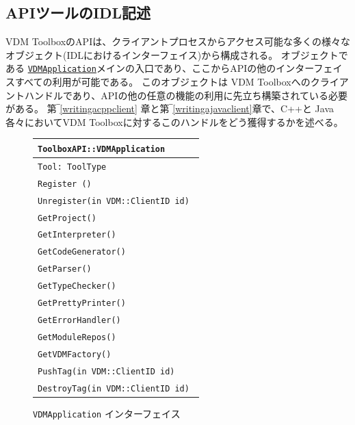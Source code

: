\documentclass[\pformat,12pt]{jarticle}
\newcommand{\VDMApplication}{\hyperlink{interface.VDMApplication}{VDMApplication}}
\begin{document}
\subsection{APIツールのIDL記述}
\label{idldescriptiontool}

VDM ToolboxのAPIは、クライアントプロセスからアクセス可能な多くの様々なオブジェクト(IDLにおけるインターフェイス)から構成される。
オブジェクトである {\tt  \VDMApplication}メインの入口であり、ここからAPIの他のインターフェイスすべての利用が可能である。
このオブジェクトは VDM Toolboxへのクライアントハンドルであり、APIの他の任意の機能の利用に先立ち構築されている必要がある。
第‾\ref{writingacppclient} 章と第‾\ref{writingajavaclient}章で、C++と Java各々においてVDM Toolboxに対するこのハンドルをどう獲得するかを述べる。


\begin{figure}[tbh]
\begin{center}
\begin{tabular}{|l|}
\hline
{\tt ToolboxAPI::VDMApplication } \\
\hline
{\tt Tool: ToolType } \\
\hline
{\tt Register () } \\
{\tt Unregister(in VDM::ClientID id) } \\
{\tt GetProject() }\\
{\tt GetInterpreter() }\\
{\tt GetCodeGenerator() }\\
{\tt GetParser() }\\
{\tt GetTypeChecker() }\\
{\tt  GetPrettyPrinter() }\\
{\tt GetErrorHandler() }\\
{\tt GetModuleRepos() }\\
{\tt GetVDMFactory() }\\
{\tt PushTag(in VDM::ClientID id) }\\
{\tt DestroyTag(in VDM::ClientID id) }\\
\hline
\end{tabular}
\caption{{\tt VDMApplication} インターフェイス}\label{fig:VDMApplication}
\end{center}
\end{figure}
\end{document}
